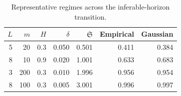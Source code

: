 \begin{table}[!htbp]
\centering
\small
\caption{Representative regimes across the inferable-horizon transition.}
\label{tab:inferable_horizon}
\begin{tabular}{rrrrrrr}
\toprule
$L$ & $m$ & $H$ & $\delta$ & $\mathfrak S$ & Empirical & Gaussian \\
\midrule
5 & 20 & 0.3 & 0.050 & 0.501 & 0.411 & 0.384 \\
8 & 10 & 0.9 & 0.020 & 1.001 & 0.633 & 0.683 \\
3 & 200 & 0.3 & 0.010 & 1.996 & 0.956 & 0.954 \\
8 & 100 & 0.3 & 0.005 & 3.001 & 0.996 & 0.997 \\
\bottomrule
\end{tabular}
\end{table}
